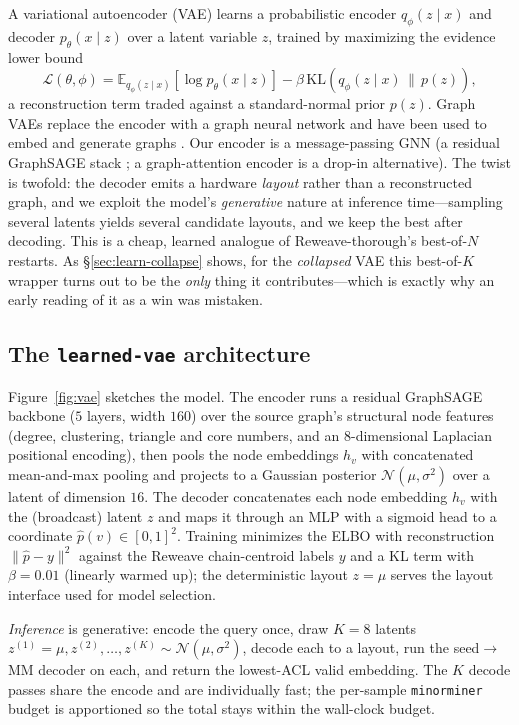 \documentclass[acmsmall,anonymous,nonacm]{acmart}
\begin{document}
A variational autoencoder (VAE) \cite{kingma2014vae} learns a probabilistic encoder
$q_\phi(z\mid x)$ and decoder $p_\theta(x\mid z)$ over a latent variable $z$,
trained by maximizing the evidence lower bound
\[
  \mathcal{L}(\theta,\phi)=\mathbb{E}_{q_\phi(z\mid x)}\!\left[\log p_\theta(x\mid z)\right]
  -\beta\,\mathrm{KL}\!\left(q_\phi(z\mid x)\,\|\,p(z)\right),
\]
a reconstruction term traded against a standard-normal prior $p(z)$. Graph VAEs
replace the encoder with a graph neural network and have been used to embed and
generate graphs \cite{kipf2016vgae,simonovsky2018graphvae}. Our encoder is a
message-passing GNN (a residual GraphSAGE stack \cite{hamilton2017graphsage}; a
graph-attention encoder \cite{velickovic2018gat} is a drop-in alternative). The
twist is twofold: the decoder emits a hardware \emph{layout} rather than a
reconstructed graph, and we exploit the model's \emph{generative} nature at
inference time---sampling several latents yields several candidate layouts, and we
keep the best after decoding. This is a cheap, learned analogue of
Reweave-thorough's best-of-$N$ restarts. As \S\ref{sec:learn-collapse} shows, for
the \emph{collapsed} VAE this best-of-$K$ wrapper turns out to be the \emph{only}
thing it contributes---which is exactly why an early reading of it as a win was
mistaken.

\subsection{The \texttt{learned-vae} architecture}
\label{sec:learn-arch}

Figure~\ref{fig:vae} sketches the model. The encoder runs a residual GraphSAGE
backbone ($5$ layers, width $160$) over the source graph's structural node features
(degree, clustering, triangle and core numbers, and an $8$-dimensional Laplacian
positional encoding), then pools the node embeddings $h_v$ with concatenated
mean-and-max pooling and projects to a Gaussian posterior $\mathcal{N}(\mu,\sigma^2)$
over a latent of dimension $16$. The decoder concatenates each node embedding $h_v$
with the (broadcast) latent $z$ and maps it through an MLP with a sigmoid head to a
coordinate $\hat{p}(v)\in[0,1]^2$. Training minimizes the ELBO with reconstruction
$\lVert \hat{p}-y\rVert^2$ against the Reweave chain-centroid labels $y$ and a
KL term with $\beta{=}0.01$ (linearly warmed up); the deterministic layout $z{=}\mu$
serves the layout interface used for model selection.

\emph{Inference} is generative: encode the query once, draw $K{=}8$ latents
$z^{(1)}{=}\mu, z^{(2)},\dots,z^{(K)}\sim\mathcal{N}(\mu,\sigma^2)$, decode each to a
layout, run the seed$\rightarrow$MM decoder on each, and return the lowest-ACL valid
embedding. The $K$ decode passes share the encode and are individually fast; the
per-sample \texttt{minorminer} budget is apportioned so the total stays within the
wall-clock budget.
\end{document}

